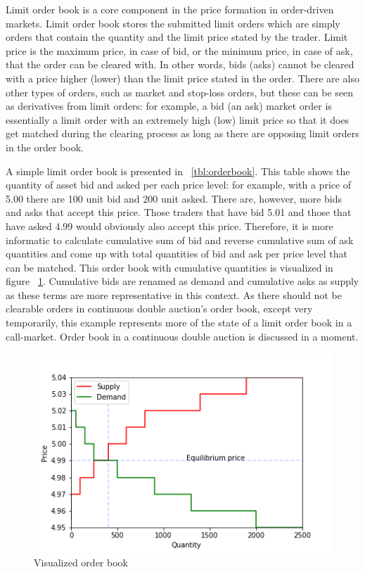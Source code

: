 Limit order book is a core component in the price formation in order-driven markets.
Limit order book stores the submitted limit orders which are simply orders that contain the quantity and 
the limit price stated by the trader. Limit price is the maximum price, in case of bid, or the minimum
price, in case of ask, that the order can be cleared with. In other words,
bids (asks) cannot be cleared with a price higher (lower) than the limit price stated 
in the order. There are also other types of orders, such as market and 
stop-loss orders, but these can be seen as derivatives from limit orders: 
for example, a bid (an ask) market order is essentially a limit order 
with an extremely high (low) limit price so that it does get matched 
during the clearing process as long as there are opposing limit orders in the 
order book. \citep{lob13} %

A simple limit order book is presented in ~\ref{tbl:orderbook}. This table shows the
quantity of asset bid and asked per each price level: for example, with a price of 5.00
there are 100 unit bid and 200 unit asked. There are, however, more bids and asks that 
accept this price. Those traders that have bid 5.01 and those that have asked 4.99 would obviously also accept
this price. Therefore, it is more informatic to calculate cumulative sum of bid and reverse cumulative sum of 
ask quantities and come up with total quantities of bid and ask per price level that can be matched.  
This order book with cumulative quantities is visualized in figure ~\ref{fig:lob_visual}. Cumulative bids
are renamed as demand and cumulative asks as supply as these terms are more representative in this context.
As there should not be clearable orders in continuous double auction's order book, except very temporarily, 
this example represents more of the state of a limit order book in a call-market. Order book
in a continuous double auction is discussed in a moment.


\begin{figure}
    \begin{center}  
        \includegraphics{plots/orderbook_visualized.png}
        \caption{Visualized order book}
        \label{fig:lob_visual}
    \end{center}
\end{figure}

